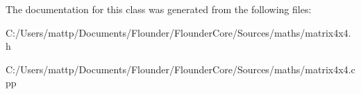 The documentation for this class was generated from the following files\+:\begin{DoxyCompactItemize}
\item 
C\+:/\+Users/mattp/\+Documents/\+Flounder/\+Flounder\+Core/\+Sources/maths/matrix4x4.\+h\item 
C\+:/\+Users/mattp/\+Documents/\+Flounder/\+Flounder\+Core/\+Sources/maths/matrix4x4.\+cpp\end{DoxyCompactItemize}
